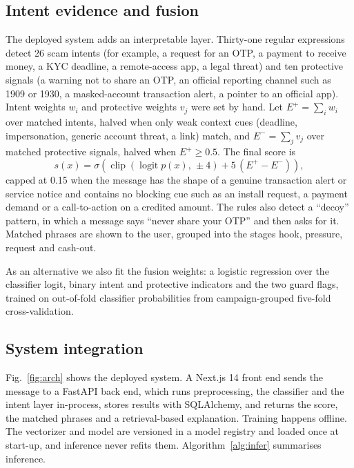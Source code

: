 \documentclass[conference]{IEEEtran}
\begin{document}
\subsection{Intent evidence and fusion}
The deployed system adds an interpretable layer. Thirty-one regular expressions detect 26 scam intents (for example, a request for an OTP, a payment to receive money, a KYC deadline, a remote-access app, a legal threat) and ten protective signals (a warning not to share an OTP, an official reporting channel such as 1909 or 1930, a masked-account transaction alert, a pointer to an official app). Intent weights $w_i$ and protective weights $v_j$ were set by hand. Let $E^{+}=\sum_i w_i$ over matched intents, halved when only weak context cues (deadline, impersonation, generic account threat, a link) match, and $E^{-}=\sum_j v_j$ over matched protective signals, halved when $E^{+}\ge 0.5$. The final score is
\begin{equation}
s(x)=\sigma\!\left(\operatorname{clip}(\operatorname{logit}p(x),\,\pm4)+5\,(E^{+}-E^{-})\right),
\end{equation}
capped at 0.15 when the message has the shape of a genuine transaction alert or service notice and contains no blocking cue such as an install request, a payment demand or a call-to-action on a credited amount. The rules also detect a ``decoy'' pattern, in which a message says ``never share your OTP'' and then asks for it. Matched phrases are shown to the user, grouped into the stages hook, pressure, request and cash-out.

As an alternative we also fit the fusion weights: a logistic regression over the classifier logit, binary intent and protective indicators and the two guard flags, trained on out-of-fold classifier probabilities from campaign-grouped five-fold cross-validation.

\subsection{System integration}
Fig.~\ref{fig:arch} shows the deployed system. A Next.js 14 front end sends the message to a FastAPI back end, which runs preprocessing, the classifier and the intent layer in-process, stores results with SQLAlchemy, and returns the score, the matched phrases and a retrieval-based explanation. Training happens offline. The vectorizer and model are versioned in a model registry and loaded once at start-up, and inference never refits them. Algorithm~\ref{alg:infer} summarises inference.
\end{document}
